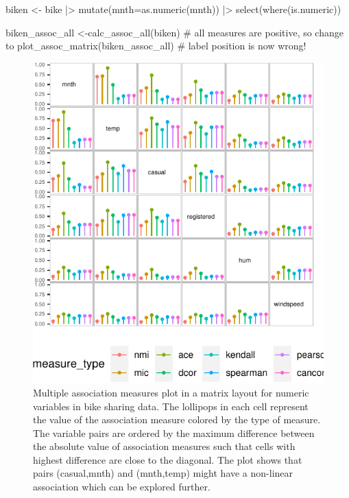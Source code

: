 \begin{Schunk}
\begin{Sinput}
biken <- bike |>
  mutate(mnth=as.numeric(mnth)) |>
  select(where(is.numeric))

biken_assoc_all <-calc_assoc_all(biken)
# all measures are positive, so change to
plot_assoc_matrix(biken_assoc_all) # label position is now wrong!
\end{Sinput}
\begin{figure}

{\centering \includegraphics{rj_paper_files/figure-latex/compare-matrix-1} 

}

\caption[Multiple association measures plot in a matrix layout for numeric variables in bike sharing data]{Multiple association measures plot in a matrix layout for numeric variables in bike sharing data. The lollipops in each cell represent the value of the association measure colored by the type of measure. The variable pairs are ordered by the maximum difference between the absolute value of association measures such that cells with highest difference are close to the diagonal. The plot shows that pairs (casual,mnth) and (mnth,temp) might have a non-linear association which can be explored further.}\label{fig:compare-matrix}
\end{figure}
\end{Schunk}

